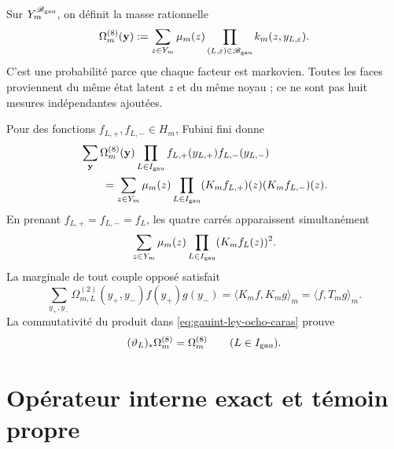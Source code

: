 Sur \(Y_m^{\mathscr B_{\rm gau}}\), on définit la masse rationnelle
\begin{equation}\label{eq:gauint-ley-ocho-caras}
 \Omega_m^{(8)}(\mathbf y)
 :=\sum_{z\in Y_m}\mu_m(z)
 \prod_{(L,\varepsilon)\in\mathscr B_{\rm gau}}
 k_m(z,y_{L,\varepsilon}).
\end{equation}
C'est une probabilité parce que chaque facteur est markovien. Toutes les faces proviennent
du même état latent \(z\) et du même noyau ; ce ne sont pas huit mesures
indépendantes ajoutées.

Pour des fonctions \(f_{L,+},f_{L,-}\in H_m\), Fubini fini donne
\begin{equation}\label{eq:gauint-fubini-ocho}
\begin{aligned}
 &\sum_{\mathbf y}\Omega_m^{(8)}(\mathbf y)
  \prod_{L\in I_{\rm gau}}
  f_{L,+}(y_{L,+})f_{L,-}(y_{L,-})\\
 &\qquad=
 \sum_{z\in Y_m}\mu_m(z)
 \prod_{L\in I_{\rm gau}}
 (K_mf_{L,+})(z)(K_mf_{L,-})(z).
\end{aligned}
\end{equation}
En prenant \(f_{L,+}=f_{L,-}=f_L\), les quatre
carrés apparaissent simultanément
\begin{equation}\label{eq:gauint-cuatro-cuadrados}
 \sum_{z\in Y_m}\mu_m(z)
 \prod_{L\in I_{\rm gau}}(K_mf_L(z))^2.
\end{equation}
La marginale de tout couple opposé satisfait
\begin{equation}\label{eq:gauint-marginal-t}
 \sum_{y_+,y_-}\Omega_{m,L}^{(2)}(y_+,y_-)
 f(y_+)g(y_-)
 =\langle K_mf,K_mg\rangle_m
 =\langle f,T_mg\rangle_m.
\end{equation}
La commutativité du produit dans \eqref{eq:gauint-ley-ocho-caras} prouve
\begin{equation}\label{eq:gauint-involuciones-ley}
 (\vartheta_L)_*\Omega_m^{(8)}=\Omega_m^{(8)}
 \qquad(L\in I_{\rm gau}).
\end{equation}

\section{Opérateur interne exact et témoin propre}

